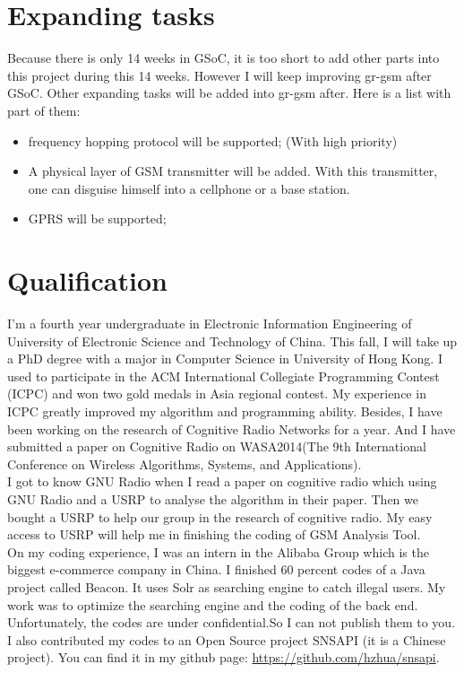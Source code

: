 \documentclass[a4paper,12pt,oneside]{article}
\begin{document}
\section{Expanding tasks}
Because there is only 14 weeks in GSoC, it is too short to add other parts into this project during this 14 weeks. However I will keep improving gr-gsm after GSoC. Other expanding tasks will be added into gr-gsm after. Here is a list with part of them:

\begin{itemize}
\item frequency hopping protocol will be supported; (With high priority)
\item A physical layer of GSM transmitter will be added. With this transmitter, one can disguise himself into a cellphone or a base station.
\item GPRS will be supported;
\end{itemize}

\section{Qualification}
I'm a fourth year undergraduate in Electronic Information Engineering of University of Electronic Science and Technology of China. This fall, I will take up a PhD degree with a major in Computer Science in University of Hong Kong. I used to participate in the ACM International Collegiate Programming Contest (ICPC) and won two gold medals in Asia regional contest. My experience in ICPC greatly improved my algorithm and programming ability. Besides, I have been working on the research of Cognitive Radio Networks for a year. And I have submitted a paper on Cognitive Radio on WASA2014(The 9th International Conference on Wireless Algorithms, Systems, and Applications). \\

I got to know GNU Radio when I read a paper on cognitive radio which using GNU Radio and a USRP to analyse the algorithm in their paper. Then we bought a USRP to help our group in the research of cognitive radio. My easy access to USRP will help me in finishing the coding of GSM Analysis Tool.\\

On my coding experience, I was an intern in the Alibaba Group which is the biggest e-commerce company in China. I finished 60 percent codes of a Java project called Beacon. It uses Solr as searching engine to catch illegal users. My work was to optimize the searching engine and the coding of the back end. Unfortunately, the codes are under confidential.So I can not publish them to you. I also contributed my codes to an Open Source project SNSAPI (it is a Chinese project). You can find it in my github page: {\color{blue}\url{https://github.com/hzhua/snsapi}}.\\
\end{document}

